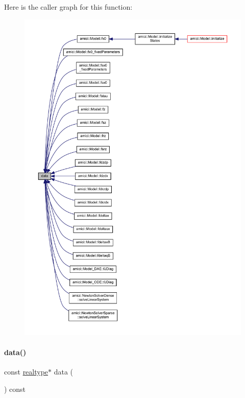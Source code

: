 Here is the caller graph for this function\+:
\nopagebreak
\begin{figure}[H]
\begin{center}
\leavevmode
\includegraphics[width=350pt]{classamici_1_1_ami_vector_aee17a5447b8e03180f89a2a8acbd572f_icgraph}
\end{center}
\end{figure}
\mbox{\label{classamici_1_1_ami_vector_a8045bd641b2f456cdbf99d0c12bb9218}} 
\paragraph{\texorpdfstring{data()}{data()}\hspace{0.1cm}{\footnotesize\ttfamily [2/2]}}
{\footnotesize\ttfamily const \mbox{\hyperlink{namespaceamici_a1bdce28051d6a53868f7ccbf5f2c14a3}{realtype}}$\ast$ data (\begin{DoxyParamCaption}{ }\end{DoxyParamCaption}) const}


